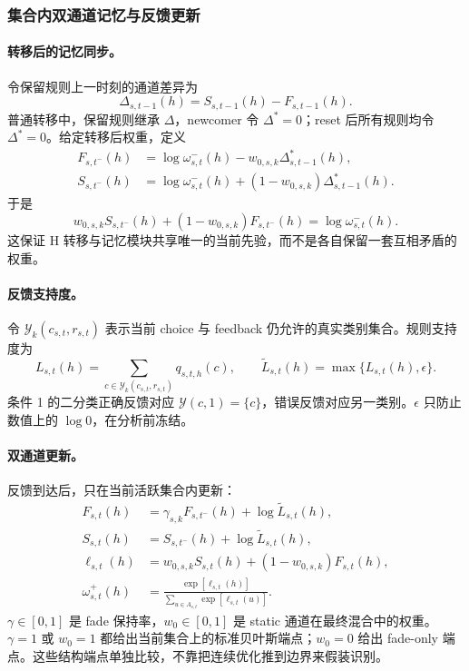 \subsubsection{集合内双通道记忆与反馈更新}

\paragraph{转移后的记忆同步。}
令保留规则上一时刻的通道差异为
\begin{equation}
    \Delta_{s,t-1}(h)=S_{s,t-1}(h)-F_{s,t-1}(h).
\end{equation}
普通转移中，保留规则继承 $\Delta$，newcomer 令 $\Delta^*=0$；reset 后所有规则均令 $\Delta^*=0$。给定转移后权重，定义
\begin{align}
    F_{s,t^-}(h)
    &=\log\omega^-_{s,t}(h)-w_{0,s,k}\Delta^*_{s,t-1}(h),\\
    S_{s,t^-}(h)
    &=\log\omega^-_{s,t}(h)+(1-w_{0,s,k})\Delta^*_{s,t-1}(h).
    \label{eq:model0805-memory-sync}
\end{align}
于是
\begin{equation}
    w_{0,s,k}S_{s,t^-}(h)
    +(1-w_{0,s,k})F_{s,t^-}(h)
    =\log\omega^-_{s,t}(h).
    \label{eq:model0805-sync-identity}
\end{equation}
这保证 H 转移与记忆模块共享唯一的当前先验，而不是各自保留一套互相矛盾的权重。

\paragraph{反馈支持度。}
令 $\mathcal Y_k(c_{s,t},r_{s,t})$ 表示当前 choice 与 feedback 仍允许的真实类别集合。规则支持度为
\begin{equation}
    L_{s,t}(h)
    =\sum_{c\in\mathcal Y_k(c_{s,t},r_{s,t})}
      q_{s,t,h}(c),
    \qquad
    \widetilde L_{s,t}(h)=\max\{L_{s,t}(h),\epsilon\}.
    \label{eq:model0805-feedback-likelihood}
\end{equation}
条件 1 的二分类正确反馈对应 $\mathcal Y(c,1)=\{c\}$，错误反馈对应另一类别。$\epsilon$ 只防止数值上的 $\log0$，在分析前冻结。

\paragraph{双通道更新。}
反馈到达后，只在当前活跃集合内更新：
\begin{align}
    F_{s,t}(h)
    &=\gamma_{s,k}F_{s,t^-}(h)+\log\widetilde L_{s,t}(h),\\
    S_{s,t}(h)
    &=S_{s,t^-}(h)+\log\widetilde L_{s,t}(h),\\
    \ell_{s,t}(h)
    &=w_{0,s,k}S_{s,t}(h)
      +(1-w_{0,s,k})F_{s,t}(h),\\
    \omega^+_{s,t}(h)
    &=\frac{\exp[\ell_{s,t}(h)]}
      {\sum_{u\in A_{s,t}}\exp[\ell_{s,t}(u)]}.
    \label{eq:model0805-memory-update}
\end{align}
$\gamma\in[0,1]$ 是 fade 保持率，$w_0\in[0,1]$ 是 static 通道在最终混合中的权重。$\gamma=1$ 或 $w_0=1$ 都给出当前集合上的标准贝叶斯端点；$w_0=0$ 给出 fade-only 端点。这些结构端点单独比较，不靠把连续优化推到边界来假装识别。

